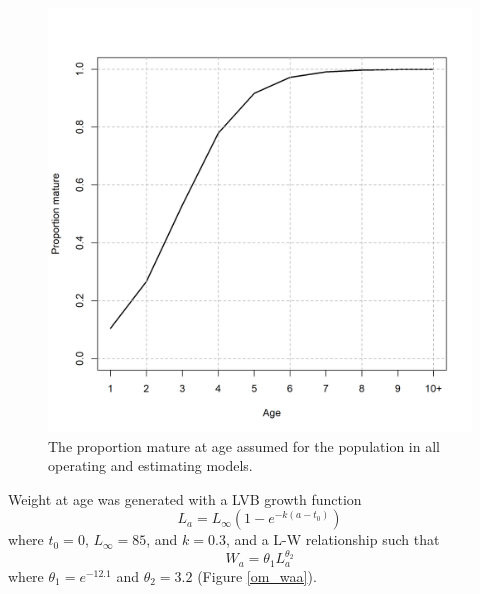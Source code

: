 \documentclass[
  12pt,
]{article}
\begin{document}
\begin{figure}
\caption{The proportion mature at age assumed for the population in all operating and estimating models.}\label{om_maturity}
\begin{center}
\includegraphics[width = \textwidth]{om_maturity.png}
\end{center}
\end{figure}

Weight at age was generated with a LVB growth function \[
L_a = L_{\infty}\left(1 - e^{-k(a - t_0)}\right)
\] where \(t_0 = 0\), \(L_\infty = 85\), and \(k = 0.3\), and a L-W
relationship such that \[
W_a = \theta_1 L_a^{\theta_2}
\] where \(\theta_1 = e^{-12.1}\) and \(\theta_2 = 3.2\) (Figure
\ref{om_waa}).
\end{document}
